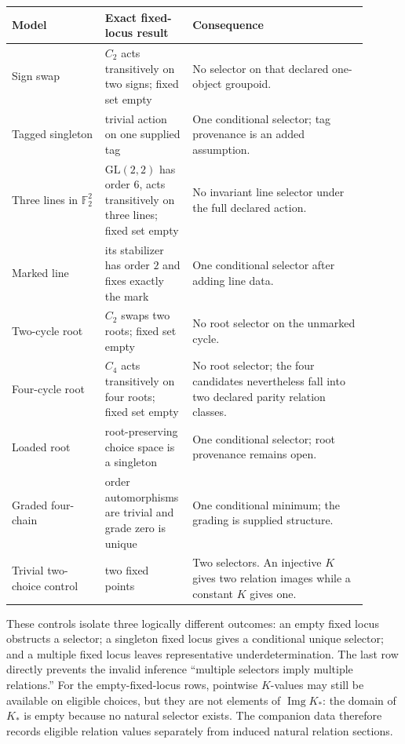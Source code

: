 \documentclass[11pt]{article}
\theoremstyle{definition}
\begin{document}
\begin{longtable}{>{\raggedright\arraybackslash}p{0.25\linewidth}
                  >{\raggedright\arraybackslash}p{0.18\linewidth}
                  >{\raggedright\arraybackslash}p{0.47\linewidth}}
\toprule
Model & Exact fixed-locus result & Consequence \\
\midrule
\endhead
Sign swap & \(C_2\) acts transitively on two signs; fixed set empty
& No selector on that declared one-object groupoid. \\
Tagged singleton & trivial action on one supplied tag
& One conditional selector; tag provenance is an added assumption. \\
Three lines in \(\mathbb F_2^2\) & \(\mathrm{GL}(2,2)\) has order \(6\),
acts transitively on three lines; fixed set empty
& No invariant line selector under the full declared action. \\
Marked line & its stabilizer has order \(2\) and fixes exactly the mark
& One conditional selector after adding line data. \\
Two-cycle root & \(C_2\) swaps two roots; fixed set empty
& No root selector on the unmarked cycle. \\
Four-cycle root & \(C_4\) acts transitively on four roots; fixed set empty
& No root selector; the four candidates nevertheless fall into two declared
parity relation classes. \\
Loaded root & root-preserving choice space is a singleton
& One conditional selector; root provenance remains open. \\
Graded four-chain & order automorphisms are trivial and grade zero is unique
& One conditional minimum; the grading is supplied structure. \\
Trivial two-choice control & two fixed points
& Two selectors.  An injective \(K\) gives two relation images while a
constant \(K\) gives one. \\
\bottomrule
\end{longtable}

These controls isolate three logically different outcomes: an empty fixed
locus obstructs a selector; a singleton fixed locus gives a conditional
unique selector; and a multiple fixed locus leaves representative
underdetermination.  The last row directly prevents the invalid inference
``multiple selectors imply multiple relations.''
For the empty-fixed-locus rows, pointwise \(K\)-values may still be available
on eligible choices, but they are not elements of \(\operatorname{Img}K_*\):
the domain of \(K_*\) is empty because no natural selector exists.  The
companion data therefore records eligible relation values separately from
induced natural relation sections.
\end{document}
